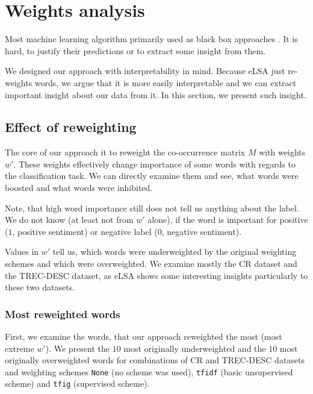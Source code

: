 \section{Weights analysis} \label{chap:weight:analysis}

    Most machine learning algorithm primarily used as black box approaches \cite{ribeiro2016should}. %
    It is hard, to justify their predictions or to extract some insight from them. 
    
    We designed our approach with interpretability in mind.
    Because eLSA just re-weights words, we argue that it is more easily interpretable and we can extract important insight about our data from it.
    In this section, we present such insight.
    
    \subsection{Effect of reweighting}
    The core of our approach it to reweight the co-occurrence matrix $M$ with weights $w'$. 
    These weights effectively change importance of some words with regards to the classification task.
    We can directly examine them and see, what words were boosted and what words were inhibited.
    
    Note, that high word importance still does not tell us anything about the label. 
    We do not know (at least not from $w'$ alone), if the word is important for positive ($1$, positive sentiment) or negative label ($0$, negative sentiment).
    
    Values in $w'$ tell us, which words were underweighted by the original weighting schemes and which were overweighted.
    We examine mostly the CR dataset and the TREC-DESC dataset, as eLSA shows some interesting insights particularly to these two datasets.

    \subsubsection{Most reweighted words}
    
    First, we examine the words, that our approach reweighted the most (most extreme $w'$).
    We present the $10$ most originally underweighted and the $10$ most originally overweighted words for combinations of CR and TREC-DESC datasets and weighting schemes \texttt{None} (no scheme was used), \texttt{tfidf} (basic unsupervised scheme) and \texttt{tfig} (supervised scheme).
    

